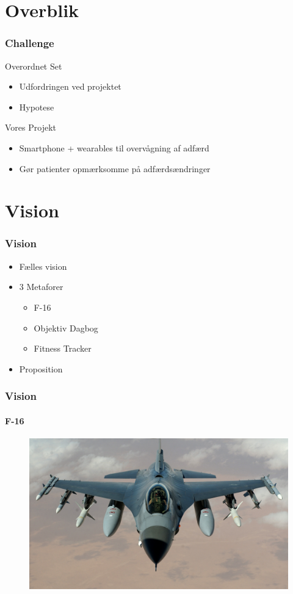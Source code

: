 \section{Overblik}
\begin{frame}
\frametitle{Challenge}
Overordnet Set
\begin{itemize}
	\item Udfordringen ved projektet
	\item Hypotese
\end{itemize}
Vores Projekt
\begin{itemize}
	\item Smartphone + wearables til overvågning af adfærd
	\item Gør patienter opmærksomme på adfærdsændringer
\end{itemize}
\end{frame}

\section{Vision}

\begin{frame}
\frametitle{Vision}
\begin{itemize}
	\item Fælles vision
	\item 3 Metaforer
	\begin{itemize}
		\item F-16
		\item Objektiv Dagbog
		\item Fitness Tracker
	\end{itemize}
	\item Proposition
\end{itemize}
\end{frame}

\begin{frame}
\frametitle{Vision}
\framesubtitle{F-16}
\begin{figure}
	\includegraphics[scale=0.4]{graphics/F16}
\end{figure}
\end{frame}


